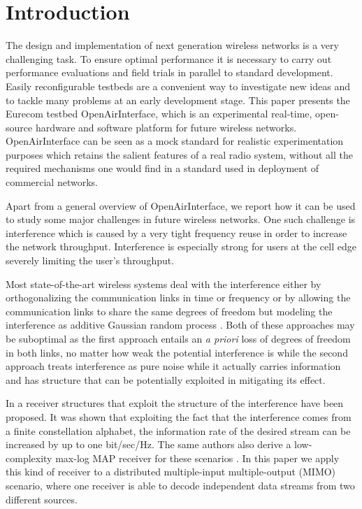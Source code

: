 \documentclass[a4paper,twocolumn,journal]{IEEEtran}
\begin{document}



\section{Introduction}


The design and implementation of next generation wireless networks is a very challenging task. To ensure optimal performance it is necessary to carry out performance evaluations and field trials in parallel to standard development. Easily reconfigurable testbeds are a convenient way to investigate new ideas and to tackle many problems at an early development stage. This paper presents the Eurecom testbed OpenAirInterface, which is an experimental real-time, open-source hardware and software platform for future wireless networks. OpenAirInterface can be seen as a mock standard for realistic experimentation purposes which retains the salient features of a real radio system, without all the required mechanisms one would find in a standard used in deployment of commercial networks.

Apart from a general overview of OpenAirInterface, we report how it can be used to study some major challenges in future wireless networks. One such challenge is interference which is caused by a very tight frequency reuse in order to increase the network throughput. Interference is especially strong for users at the cell edge severely limiting the user's throughput. 

Most state-of-the-art wireless systems deal with the interference either by orthogonalizing the communication links in time or frequency \cite{Gesbert07adaption} or by allowing the communication links to share the same degrees of freedom but modeling the interference as additive Gaussian random process \cite{Russell1995}. Both of these approaches may be suboptimal as the first approach entails an \textit{a priori} loss of degrees of freedom in both links, no matter how weak the potential interference is while the second approach treats interference as pure noise while it actually carries information and has structure that can be potentially exploited in mitigating its effect. 

In \cite{ghaffar08b,ghaffar08c} a receiver structures that exploit the structure of the interference have been proposed. It was shown that exploiting the fact that the interference comes from a finite constellation alphabet, the information rate of the desired stream can be increased by up to one bit/sec/Hz. The same authors also derive a low-complexity max-log MAP receiver for these scenarios \cite{ghaffar09a}. In this paper we apply this kind of receiver to a distributed multiple-input multiple-output (MIMO) scenario, where one receiver is able to decode independent data streams from two different sources.
\end{document}

